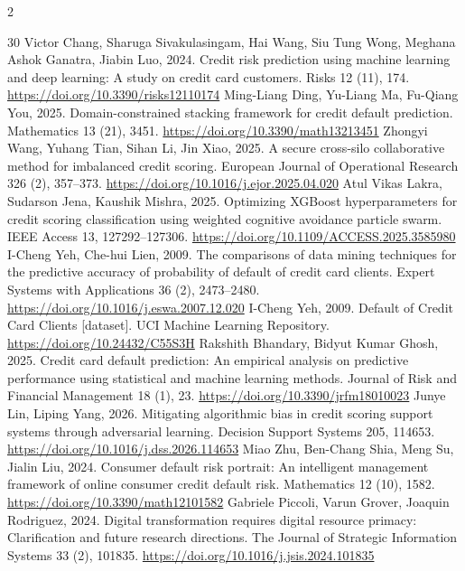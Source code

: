\documentclass[12pt]{article}
\begin{document}
\begin{singlespace}
{\begin{multicols}{2}
\begin{thebibliography}{30}
 Victor Chang, Sharuga Sivakulasingam, Hai Wang, Siu Tung Wong, Meghana Ashok Ganatra, Jiabin Luo, 2024. Credit risk prediction using machine learning and deep learning: A study on credit card customers. Risks 12 (11), 174. \url{https://doi.org/10.3390/risks12110174}
 Ming-Liang Ding, Yu-Liang Ma, Fu-Qiang You, 2025. Domain-constrained stacking framework for credit default prediction. Mathematics 13 (21), 3451. \url{https://doi.org/10.3390/math13213451}
 Zhongyi Wang, Yuhang Tian, Sihan Li, Jin Xiao, 2025. A secure cross-silo collaborative method for imbalanced credit scoring. European Journal of Operational Research 326 (2), 357--373. \url{https://doi.org/10.1016/j.ejor.2025.04.020}
 Atul Vikas Lakra, Sudarson Jena, Kaushik Mishra, 2025. Optimizing XGBoost hyperparameters for credit scoring classification using weighted cognitive avoidance particle swarm. IEEE Access 13, 127292--127306. \url{https://doi.org/10.1109/ACCESS.2025.3585980}
 I-Cheng Yeh, Che-hui Lien, 2009. The comparisons of data mining techniques for the predictive accuracy of probability of default of credit card clients. Expert Systems with Applications 36 (2), 2473--2480. \url{https://doi.org/10.1016/j.eswa.2007.12.020}
 I-Cheng Yeh, 2009. Default of Credit Card Clients [dataset]. UCI Machine Learning Repository. \url{https://doi.org/10.24432/C55S3H}
 Rakshith Bhandary, Bidyut Kumar Ghosh, 2025. Credit card default prediction: An empirical analysis on predictive performance using statistical and machine learning methods. Journal of Risk and Financial Management 18 (1), 23. \url{https://doi.org/10.3390/jrfm18010023}
 Junye Lin, Liping Yang, 2026. Mitigating algorithmic bias in credit scoring support systems through adversarial learning. Decision Support Systems 205, 114653. \url{https://doi.org/10.1016/j.dss.2026.114653}
 Miao Zhu, Ben-Chang Shia, Meng Su, Jialin Liu, 2024. Consumer default risk portrait: An intelligent management framework of online consumer credit default risk. Mathematics 12 (10), 1582. \url{https://doi.org/10.3390/math12101582}
 Gabriele Piccoli, Varun Grover, Joaquin Rodriguez, 2024. Digital transformation requires digital resource primacy: Clarification and future research directions. The Journal of Strategic Information Systems 33 (2), 101835. \url{https://doi.org/10.1016/j.jsis.2024.101835}
\end{thebibliography}
\end{multicols}}
\end{singlespace}
\end{document}
